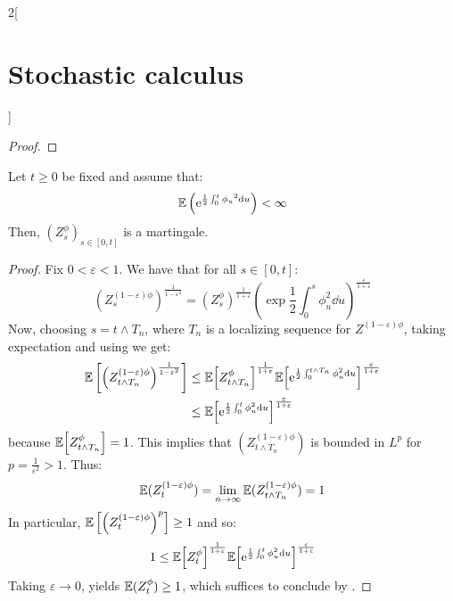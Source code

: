 \documentclass[../../../main_math.tex]{subfiles}
\begin{document}
\begin{multicols}{2}[\section{Stochastic calculus}]
\begin{proof}
  \end{proof}
  \begin{theorem}
    Let $t\geq 0$ be fixed and assume that:
    $$
      \mathbb{E}\left(\mathrm{e}^{\frac{1}{2}\int_0^t{\phi_u}^2\dd{u}}\right)<\infty
    $$
    Then, ${(Z^\phi_s)}_{s\in[0,t]}$ is a martingale.
  \end{theorem}
  \begin{proof}
    Fix $0<\varepsilon<1$. We have that for all $s\in[0,t]$:
    $$
      {\left( Z_s^{(1-\varepsilon)\phi}\right)}^{\frac{1}{1-\varepsilon^2}}={\left( Z_s^\phi\right)}^{\frac{1}{1+\varepsilon}}{\left(\exp{\frac{1}{2}\int_0^s \phi_u^2\dd{u}}\right)}^{\frac{\varepsilon}{1+\varepsilon}}
    $$
    Now, choosing $s=t\wedge T_n$, where $T_n$ is a localizing sequence for $Z^{(1-\varepsilon)\phi}$, taking expectation and using  we get:
    \begin{align*}
      \mathbb{E}\left[
        {\left( Z_{t\wedge T_n}^{(1-\varepsilon)\phi}\right)}^{\frac{1}{1-\varepsilon^2}}
      \right] & \leq \mathbb{E}{\left[
          { Z_{t\wedge T_n}^\phi}\right]}^{\frac{1}{1+\varepsilon}}\mathbb{E}{\left[
      {\mathrm{e}^{\frac{1}{2}\int_0^{t\wedge T_n} \phi_u^2\dd{u}}}\right]}^{\frac{\varepsilon}{1+\varepsilon}} \\
              & \leq \mathbb{E}{\left[
          {\mathrm{e}^{\frac{1}{2}\int_0^{t} \phi_u^2\dd{u}}}\right]}^{\frac{\varepsilon}{1+\varepsilon}}
    \end{align*}
    because $\mathbb{E}{\left[
          { Z_{t\wedge T_n}^\phi}\right]}=1$.  This implies that ${(Z_{t\wedge T_n}^{(1-\varepsilon)\phi})}$ is bounded in $L^p$ for $p=\frac{1}{\varepsilon^2}>1$. Thus:
    $$
      \mathbb{E}(Z_{t}^{(1-\varepsilon)\phi})=\lim_{n\to\infty}\mathbb{E}(Z_{t\wedge T_n}^{(1-\varepsilon)\phi})=1
    $$
    In particular, $\mathbb{E}\left[{\left( Z_{t}^{(1-\varepsilon)\phi}\right)}^{p}\right]\geq 1$ and so:
    $$
      1\leq \mathbb{E}{\left[
          { Z_{t}^\phi}\right]}^{\frac{1}{1+\varepsilon}}\mathbb{E}{\left[
          {\mathrm{e}^{\frac{1}{2}\int_0^{t} \phi_u^2\dd{u}}}\right]}^{\frac{\varepsilon}{1+\varepsilon}}
    $$
    Taking $\varepsilon\to 0$, yields $\mathbb{E}(Z_t^\phi)\geq 1$, which suffices to conclude by .
  \end{proof}

\end{multicols}
\end{document}
